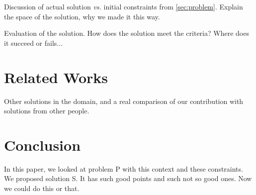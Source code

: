 \documentclass[a4paper,11pt,twocolumn,twoside]{article}
\begin{document}
Discussion of actual solution \emph{vs.} initial constraints from
\ref{sec:problem}. Explain the space of the solution, why we made it this way.

Evaluation of the solution. How does the solution meet the criteria? Where
does it succeed or fails...


\section{Related Works}
\label{sec:related}

Other solutions in the domain, and a real comparison of our contribution with
solutions from other people.


\section{Conclusion}
\label{sec:conclusion}

In this paper, we looked at problem P with this context and these
constraints. We proposed solution S. It has such good points and such not so
good ones. Now we could do this or that.


% 
% 

% 
\end{document}
